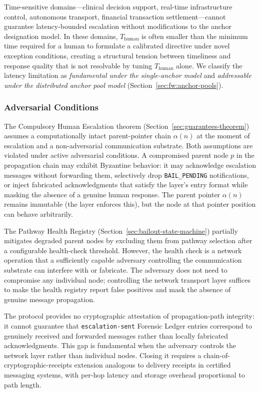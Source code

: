 Time-sensitive domains---clinical decision support, real-time infrastructure control, autonomous transport, financial transaction settlement---cannot guarantee latency-bounded escalation without modifications to the anchor designation model. In these domains, $T_{\text{human}}$ is often smaller than the minimum time required for a human to formulate a calibrated directive under novel exception conditions, creating a structural tension between timeliness and response quality that is not resolvable by tuning $T_{\text{human}}$ alone. We classify the latency limitation as \emph{fundamental under the single-anchor model} and \emph{addressable under the distributed anchor pool model} (Section~\ref{sec:fw:anchor-pools}).

\subsubsection{Adversarial Conditions}
\label{sec:lim:adversarial}

The Compulsory Human Escalation theorem (Section~\ref{sec:guarantees-theorem}) assumes a computationally intact parent-pointer chain $\alpha(n)$ at the moment of escalation and a non-adversarial communication substrate. Both assumptions are violated under active adversarial conditions. A compromised parent node $p$ in the propagation chain may exhibit Byzantine behavior: it may acknowledge escalation messages without forwarding them, selectively drop \texttt{BAIL\_PENDING} notifications, or inject fabricated acknowledgments that satisfy the \fact{} layer's entry format while masking the absence of a genuine human response. The parent pointer $\alpha(n)$ remains immutable (the \fact{} layer enforces this), but the node at that pointer position can behave arbitrarily.

The Pathway Health Registry (Section~\ref{sec:bailout-state-machine}) partially mitigates degraded parent nodes by excluding them from pathway selection after a configurable health-check threshold. However, the health check is a network operation that a sufficiently capable adversary controlling the communication substrate can interfere with or fabricate. The adversary does not need to compromise any individual node; controlling the network transport layer suffices to make the health registry report false positives and mask the absence of genuine message propagation.

The protocol provides no cryptographic attestation of propagation-path integrity: it cannot guarantee that \texttt{escalation-sent} Forensic Ledger entries correspond to genuinely received and forwarded messages rather than locally fabricated acknowledgments. This gap is fundamental when the adversary controls the network layer rather than individual nodes. Closing it requires a chain-of-cryptographic-receipts extension analogous to delivery receipts in certified messaging systems, with per-hop latency and storage overhead proportional to path length.

